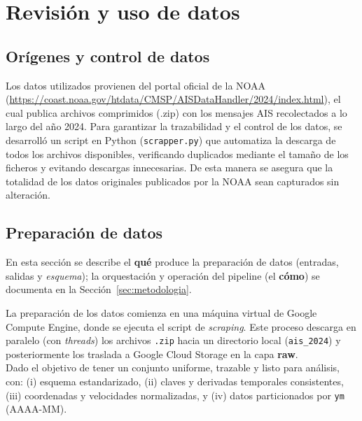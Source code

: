 \documentclass[10pt]{article}
\begin{document}
\section{Revisión y uso de datos}
\subsection{Orígenes y control de datos} %

Los datos utilizados provienen del portal oficial de la NOAA (\url{https://coast.noaa.gov/htdata/CMSP/AISDataHandler/2024/index.html}), el cual publica archivos comprimidos (.zip) con los mensajes AIS recolectados a lo largo del año 2024. 
Para garantizar la trazabilidad y el control de los datos, se desarrolló un script en Python (\texttt{scrapper.py}) que automatiza la descarga de todos los archivos disponibles, verificando duplicados mediante el tamaño de los ficheros y evitando descargas innecesarias. 
De esta manera se asegura que la totalidad de los datos originales publicados por la NOAA sean capturados sin alteración.

\subsection{Preparación de datos} %
En esta sección se describe el \textbf{qué} produce la preparación de datos (entradas, salidas y \emph{esquema}); la orquestación y operación del pipeline (el \textbf{cómo}) se documenta en la Sección~\ref{sec:metodologia}.

La preparación de los datos comienza en una máquina virtual de Google Compute Engine, donde se ejecuta el script de \textit{scraping}. Este proceso descarga en paralelo (con \textit{threads}) los archivos \texttt{.zip} hacia un directorio local (\texttt{ais\_2024}) y posteriormente los traslada a Google Cloud Storage en la capa \textbf{raw}.\\

Dado el objetivo de tener un conjunto uniforme, trazable y listo para análisis, con: (i) esquema estandarizado, (ii) claves y derivadas temporales consistentes, (iii) coordenadas y velocidades normalizadas, y (iv) datos particionados por \texttt{ym} (AAAA-MM).
\end{document}
